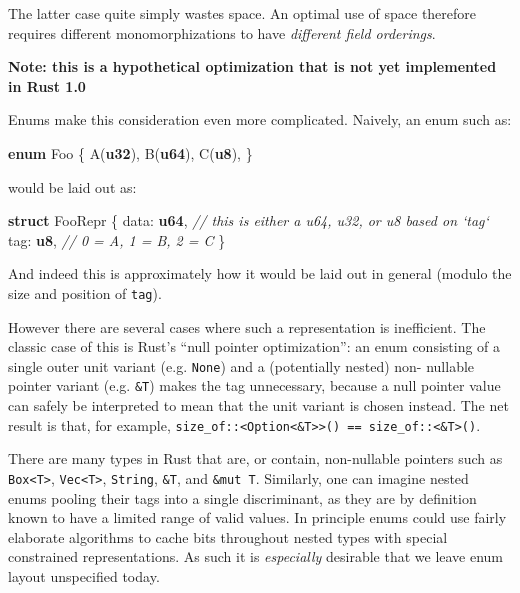 \documentclass[a4paper,]{book}
\newenvironment{Shaded}{\begin{snugshade}}{\end{snugshade}}
\newcommand{\KeywordTok}[1]{\textcolor[rgb]{0.13,0.29,0.53}{\textbf{{#1}}}}
\newcommand{\CommentTok}[1]{\textcolor[rgb]{0.56,0.35,0.01}{\textit{{#1}}}}
\newcommand{\NormalTok}[1]{{#1}}
\begin{document}
The latter case quite simply wastes space. An optimal use of space
therefore requires different monomorphizations to have \emph{different
field orderings}.

\textbf{Note: this is a hypothetical optimization that is not yet
implemented in Rust 1.0}

Enums make this consideration even more complicated. Naively, an enum
such as:

\begin{Shaded}
\begin{Highlighting}[]
\KeywordTok{enum} \NormalTok{Foo \{}
    \NormalTok{A(}\KeywordTok{u32}\NormalTok{),}
    \NormalTok{B(}\KeywordTok{u64}\NormalTok{),}
    \NormalTok{C(}\KeywordTok{u8}\NormalTok{),}
\NormalTok{\}}
\end{Highlighting}
\end{Shaded}

would be laid out as:

\begin{Shaded}
\begin{Highlighting}[]
\KeywordTok{struct} \NormalTok{FooRepr \{}
    \NormalTok{data: }\KeywordTok{u64}\NormalTok{, }\CommentTok{// this is either a u64, u32, or u8 based on `tag`}
    \NormalTok{tag: }\KeywordTok{u8}\NormalTok{,   }\CommentTok{// 0 = A, 1 = B, 2 = C}
\NormalTok{\}}
\end{Highlighting}
\end{Shaded}

And indeed this is approximately how it would be laid out in general
(modulo the size and position of \texttt{tag}).

However there are several cases where such a representation is
inefficient. The classic case of this is Rust's ``null pointer
optimization'': an enum consisting of a single outer unit variant (e.g.
\texttt{None}) and a (potentially nested) non- nullable pointer variant
(e.g. \texttt{\&T}) makes the tag unnecessary, because a null pointer
value can safely be interpreted to mean that the unit variant is chosen
instead. The net result is that, for example,
\texttt{size\_of::\textless{}Option\textless{}\&T\textgreater{}\textgreater{}()\ ==\ size\_of::\textless{}\&T\textgreater{}()}.

There are many types in Rust that are, or contain, non-nullable pointers
such as \texttt{Box\textless{}T\textgreater{}},
\texttt{Vec\textless{}T\textgreater{}}, \texttt{String}, \texttt{\&T},
and \texttt{\&mut\ T}. Similarly, one can imagine nested enums pooling
their tags into a single discriminant, as they are by definition known
to have a limited range of valid values. In principle enums could use
fairly elaborate algorithms to cache bits throughout nested types with
special constrained representations. As such it is \emph{especially}
desirable that we leave enum layout unspecified today.
\end{document}
